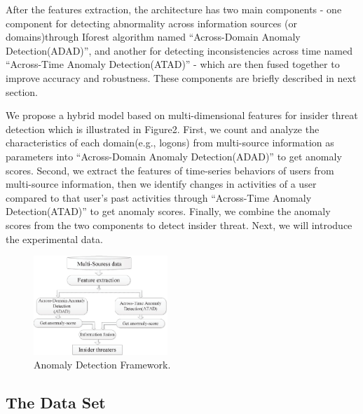 \documentclass[conference]{IEEEtran}
\begin{document}
After the features extraction, the architecture has two main components - one component for detecting abnormality across information sources (or domains)through Iforest algorithm named “Across-Domain Anomaly Detection(ADAD)”, and another for detecting inconsistencies across time named “Across-Time Anomaly Detection(ATAD)” - which are then fused together to improve accuracy and robustness. These components are briefly described in next section.
\fi

We propose a hybrid model based on multi-dimensional features for insider threat detection which is illustrated in Figure2. First, we count and analyze the characteristics of each domain(e.g., logons) from multi-source information as parameters into “Across-Domain Anomaly Detection(ADAD)” to get anomaly scores. Second, we extract the features of time-series behaviors of users from multi-source information, then we identify changes in activities of a user compared to that user’s past activities through “Across-Time Anomaly Detection(ATAD)” to get anomaly scores. Finally, we combine the anomaly scores from the two components to detect insider threat. Next, we will introduce the experimental data. 


\begin{figure}[htb]
\centerline{\includegraphics[width = 0.45\textwidth]{figure/figure2.eps}}
\caption{Anomaly Detection Framework.}
\label{fig}
\end{figure}

\subsection{The Data Set}
\end{document}
